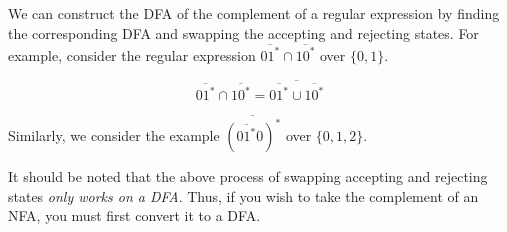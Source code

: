 We can construct the DFA of the complement of a regular expression by finding the corresponding DFA and swapping the accepting and rejecting states. For example, consider the regular expression $\overline{01^*}\cap\overline{10^*}$ over $\{0, 1\}$. 

\[\overline{01^*}\cap\overline{10^*}=\overline{\overline{01^*}\cup\overline{10^*}}\]

Similarly, we consider the example $\overline{(\overline{01^*}0)^*}$ over $\{0,1,2\}$.

It should be noted that the above process of swapping accepting and rejecting states \textit{only works on a DFA}. Thus, if you wish to take the complement of an NFA, you must first convert it to a DFA. 

